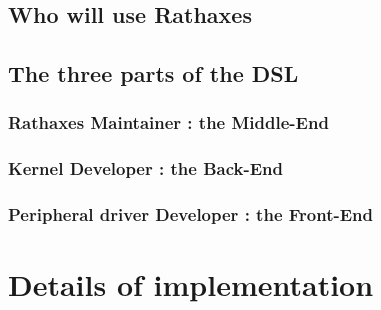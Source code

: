 \documentclass{rtxreport}
\begin{document}
\section{Who will use Rathaxes}

\section{The three parts of the DSL}
\subsection{Rathaxes Maintainer : the Middle-End}
\subsection{Kernel Developer : the Back-End}
\subsection{Peripheral driver Developer : the Front-End}



\chapter{Details of implementation}
\end{document}

